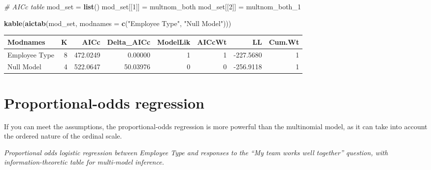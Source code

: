 \documentclass[]{book}
\newenvironment{Shaded}{\begin{snugshade}}{\end{snugshade}}
\newcommand{\KeywordTok}[1]{\textcolor[rgb]{0.13,0.29,0.53}{\textbf{{#1}}}}
\newcommand{\DataTypeTok}[1]{\textcolor[rgb]{0.13,0.29,0.53}{{#1}}}
\newcommand{\DecValTok}[1]{\textcolor[rgb]{0.00,0.00,0.81}{{#1}}}
\newcommand{\StringTok}[1]{\textcolor[rgb]{0.31,0.60,0.02}{{#1}}}
\newcommand{\CommentTok}[1]{\textcolor[rgb]{0.56,0.35,0.01}{\textit{{#1}}}}
\newcommand{\NormalTok}[1]{{#1}}
\begin{document}
\begin{Shaded}
\begin{Highlighting}[]
\CommentTok{# AICc table}
\NormalTok{mod_set =}\StringTok{ }\KeywordTok{list}\NormalTok{()}
    \NormalTok{mod_set[[}\DecValTok{1}\NormalTok{]] =}\StringTok{ }\NormalTok{multnom_both}
    \NormalTok{mod_set[[}\DecValTok{2}\NormalTok{]] =}\StringTok{ }\NormalTok{multnom_both_1}

\KeywordTok{kable}\NormalTok{(}\KeywordTok{aictab}\NormalTok{(mod_set, }\DataTypeTok{modnames =} \KeywordTok{c}\NormalTok{(}\StringTok{"Employee Type"}\NormalTok{, }\StringTok{"Null Model"}\NormalTok{)))}
\end{Highlighting}
\end{Shaded}

\begin{tabular}{l|r|r|r|r|r|r|r}
\hline
Modnames & K & AICc & Delta\_AICc & ModelLik & AICcWt & LL & Cum.Wt\\
\hline
Employee Type & 8 & 472.0249 & 0.00000 & 1 & 1 & -227.5680 & 1\\
\hline
Null Model & 4 & 522.0647 & 50.03976 & 0 & 0 & -256.9118 & 1\\
\hline
\end{tabular}

\section{Proportional-odds
regression}\label{proportional-odds-regression}

If you can meet the assumptions, the proportional-odds regression is
more powerful than the multinomial model, as it can take into account
the ordered nature of the ordinal scale.

\emph{Proportional odds logistic regression between Employee Type and
responses to the ``My team works well together'' question, with
information-theoretic table for multi-model inference.}
\end{document}
